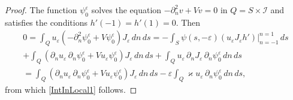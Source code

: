 \documentclass[reqno]{amsart}
\theoremstyle{plain}
\numberwithin{equation}{section}
\renewcommand{\kappa}{\varkappa}
\newcommand{\eps}{\varepsilon}
\newcommand{\cI}{\mathcal{I}}
\begin{document}
\begin{proof}
 The function $\psi_0^\eps$ solves the equation $-\partial_n^2v+Vv=0$ in $Q=S\times \cI$ and satisfies the conditions $h'(-1)=h'(1)=0$. Then
\begin{multline*}
  0=\int_Q u_\eps(-\partial_n^2\psi_0^\eps+V \psi_0^\eps)J_\eps\,dn\,ds
  =-\int_S\psi(s,-\eps) ( u_\eps J_\eps h')\big|_{n=-1}^{n=1}\,ds
  \\+
  \int_Q (\partial_n u_\eps \, \partial_n \psi_0^\eps+Vu_\eps \psi_0^\eps)J_\eps\,dn\,ds+
  \int_Q u_\eps\,\partial_n J_\eps \,\partial_n \psi_0^\eps\,dn\,ds
  \\=\int_Q (\partial_n u_\eps \, \partial_n \psi_0^\eps+Vu_\eps \psi_0^\eps)J_\eps\,dn\,ds-\eps
  \int_Q \kappa u_\eps\,\partial_n \psi_0^\eps\,dn\,ds,
\end{multline*}
from which \eqref{IntInLocal1} follows.






\end{proof}
\end{document}
